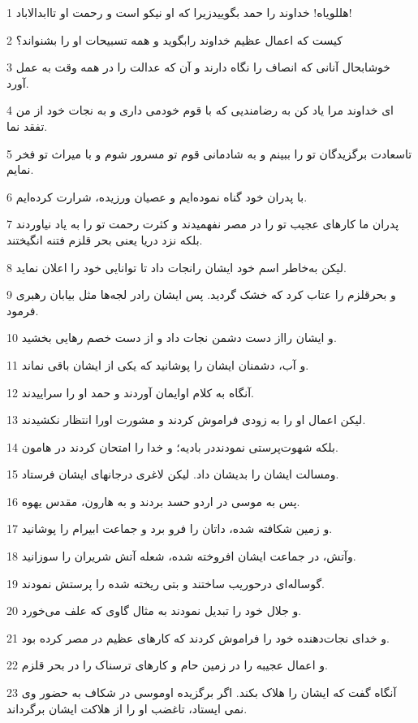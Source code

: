 \par 1 هللویاه! خداوند را حمد بگوییدزیرا که او نیکو است و رحمت او تاابدالاباد!
\par 2 کیست که اعمال عظیم خداوند رابگوید و همه تسبیحات او را بشنواند؟
\par 3 خوشابحال آنانی که انصاف را نگاه دارند و آن که عدالت را در همه وقت به عمل آورد.
\par 4 ‌ای خداوند مرا یاد کن به رضامندیی که با قوم خودمی داری و به نجات خود از من تفقد نما.
\par 5 تاسعادت برگزیدگان تو را ببینم و به شادمانی قوم تو مسرور شوم و با میراث تو فخر نمایم.
\par 6 با پدران خود گناه نموده‌ایم و عصیان ورزیده، شرارت کرده‌ایم.
\par 7 پدران ما کارهای عجیب تو را در مصر نفهمیدند و کثرت رحمت تو را به یاد نیاوردند بلکه نزد دریا یعنی بحر قلزم فتنه انگیختند.
\par 8 لیکن به‌خاطر اسم خود ایشان رانجات داد تا توانایی خود را اعلان نماید.
\par 9 و بحرقلزم را عتاب کرد که خشک گردید. پس ایشان رادر لجه‌ها مثل بیابان رهبری فرمود.
\par 10 و ایشان رااز دست دشمن نجات داد و از دست خصم رهایی بخشید.
\par 11 و آب، دشمنان ایشان را پوشانید که یکی از ایشان باقی نماند.
\par 12 آنگاه به کلام اوایمان آوردند و حمد او را سراییدند.
\par 13 لیکن اعمال او را به زودی فراموش کردند و مشورت اورا انتظار نکشیدند.
\par 14 بلکه شهوت‌پرستی نمودنددر بادیه؛ و خدا را امتحان کردند در هامون.
\par 15 ومسالت ایشان را بدیشان داد. لیکن لاغری درجانهای ایشان فرستاد.
\par 16 پس به موسی در اردو حسد بردند و به هارون، مقدس یهوه.
\par 17 و زمین شکافته شده، داتان را فرو برد و جماعت ابیرام را پوشانید.
\par 18 وآتش، در جماعت ایشان افروخته شده، شعله آتش شریران را سوزانید.
\par 19 گوساله‌ای درحوریب ساختند و بتی ریخته شده را پرستش نمودند.
\par 20 و جلال خود را تبدیل نمودند به مثال گاوی که علف می‌خورد.
\par 21 و خدای نجات‌دهنده خود را فراموش کردند که کارهای عظیم در مصر کرده بود.
\par 22 و اعمال عجیبه را در زمین حام و کارهای ترسناک را در بحر قلزم.
\par 23 آنگاه گفت که ایشان را هلاک بکند. اگر برگزیده اوموسی در شکاف به حضور وی نمی ایستاد، تاغضب او را از هلاکت ایشان برگرداند.
